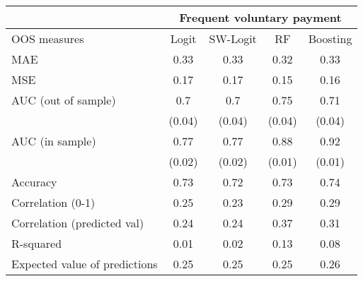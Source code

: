 \begin{tabular}{lcccc}
\toprule
      & \multicolumn{4}{c}{Frequent voluntary payment } \\
\midrule
\midrule
OOS measures & Logit & SW-Logit & RF    & Boosting \\
\midrule
\midrule
MAE   & 0.33  & 0.33  & 0.32  & 0.33 \\
MSE   & 0.17  & 0.17  & 0.15  & 0.16 \\
AUC (out of sample) & 0.7   & 0.7   & 0.75  & 0.71 \\
      & (0.04) & (0.04) & (0.04) & (0.04) \\
AUC (in sample) & 0.77  & 0.77  & 0.88  & 0.92 \\
      & (0.02) & (0.02) & (0.01) & (0.01) \\
Accuracy & 0.73  & 0.72  & 0.73  & 0.74 \\
Correlation (0-1) & 0.25  & 0.23  & 0.29  & 0.29 \\
Correlation (predicted val) & 0.24  & 0.24  & 0.37  & 0.31 \\
R-squared  & 0.01  & 0.02  & 0.13  & 0.08 \\
Expected value of predictions & 0.25  & 0.25  & 0.25  & 0.26 \\
\bottomrule
\bottomrule
\end{tabular}%
